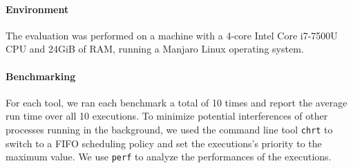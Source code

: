 \paragraph{Environment}
The evaluation was performed on a machine with a 4-core Intel Core i7-7500U CPU and 24GiB of RAM, running a Manjaro Linux operating system.

\paragraph{Benchmarking}
For each tool, we ran each benchmark a total of 10 times and report the average run time over all 10 executions. To minimize potential interferences of other processes running in the background, we used the command line tool \texttt{chrt} to switch to a FIFO scheduling policy and set the executions's priority to the maximum value.
We use \texttt{perf} to analyze the performances of the executions.

